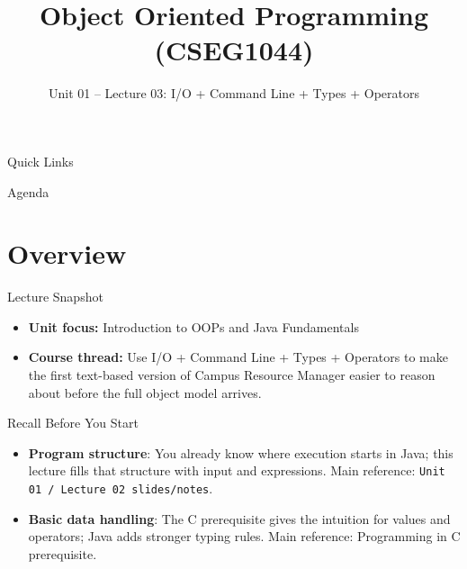 \documentclass{beamer}
\title[OOPS with Java]{Object Oriented Programming (CSEG1044)}
\subtitle{Unit 01 -- Lecture 03: I/O + Command Line + Types + Operators}
\begin{document}
\begin{frame}[fragile]
  \titlepage
  \vspace{0.5em}
  \slidesources{\OOPSUnitISources}
\end{frame}

\begin{frame}{Quick Links}
  \centering
  \hyperlink{sec:overview}{}\hspace{0.6em}
  \hyperlink{sec:concepts}{}\hspace{0.6em}
  \hyperlink{sec:demo}{}\hspace{0.6em}
  \hyperlink{sec:summary}{}
  \slidesources{\OOPSUnitISources}
\end{frame}

\begin{frame}{Agenda}
  \tableofcontents
  \slidesources{\OOPSUnitISources}
\end{frame}

\section{Overview}
\label{sec:overview}

\begin{frame}{Lecture Snapshot}
\begin{itemize}[<+->]
  \item \textbf{Unit focus:} Introduction to OOPs and Java Fundamentals
  \item \textbf{Course thread:} Use I/O + Command Line + Types + Operators to make the first text-based version of Campus Resource Manager easier to reason about before the full object model arrives.
\end{itemize}
  \slidesources{\OOPSUnitISources}
\end{frame}

\begin{frame}{Recall Before You Start}
\begin{itemize}[<+->]
  \item \textbf{Program structure}: You already know where execution starts in Java; this lecture fills that structure with input and expressions. Main reference: \texttt{Unit 01 / Lecture 02 slides/notes}.
  \item \textbf{Basic data handling}: The C prerequisite gives the intuition for values and operators; Java adds stronger typing rules. Main reference: Programming in C prerequisite.
\end{itemize}
  \slidesources{\OOPSUnitISources}
\end{frame}
\end{document}
